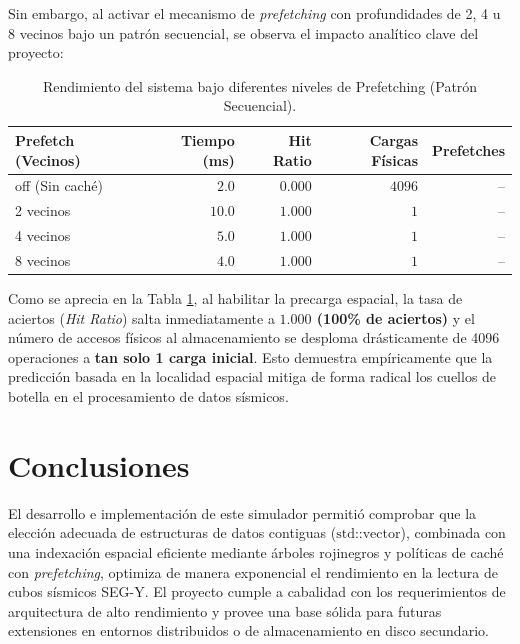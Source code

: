 \documentclass[11pt, a4paper]{article}
\begin{document}
Sin embargo, al activar el mecanismo de \textit{prefetching} con profundidades de 2, 4 u 8 vecinos bajo un patrón secuencial, se observa el impacto analítico clave del proyecto:

\begin{table}[h]
    \centering
    \caption{Rendimiento del sistema bajo diferentes niveles de Prefetching (Patrón Secuencial).}
    \label{tab:prefetch_results}
    \begin{tabular}{lrrrr}
        \toprule
        \textbf{Prefetch (Vecinos)} & \textbf{Tiempo (ms)} & \textbf{Hit Ratio} & \textbf{Cargas Físicas} & \textbf{Prefetches} \\
        \midrule
        off (Sin caché) & $2.0$ & $0.000$ & $4096$ & -- \\
        2 vecinos       & $10.0$ & $1.000$ & $1$ & -- \\
        4 vecinos       & $5.0$ & $1.000$ & $1$ & -- \\
        8 vecinos       & $4.0$ & $1.000$ & $1$ & -- \\
        \bottomrule
    \end{tabular}
\end{table}

Como se aprecia en la Tabla \ref{tab:prefetch_results}, al habilitar la precarga espacial, la tasa de aciertos (\textit{Hit Ratio}) salta inmediatamente a \textbf{$1.000$ (100\% de aciertos)} y el número de accesos físicos al almacenamiento se desploma drásticamente de 4096 operaciones a \textbf{tan solo 1 carga inicial}. Esto demuestra empíricamente que la predicción basada en la localidad espacial mitiga de forma radical los cuellos de botella en el procesamiento de datos sísmicos.

\section{Conclusiones}
El desarrollo e implementación de este simulador permitió comprobar que la elección adecuada de estructuras de datos contiguas ($\text{std::vector}$), combinada con una indexación espacial eficiente mediante árboles rojinegros y políticas de caché con \textit{prefetching}, optimiza de manera exponencial el rendimiento en la lectura de cubos sísmicos SEG-Y. El proyecto cumple a cabalidad con los requerimientos de arquitectura de alto rendimiento y provee una base sólida para futuras extensiones en entornos distribuidos o de almacenamiento en disco secundario.
\end{document}
